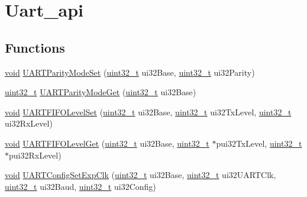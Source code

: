 \hypertarget{group__uart__api}{}\section{Uart\+\_\+api}
\label{group__uart__api}
\subsection*{Functions}
\begin{DoxyCompactItemize}
\item 
\hyperlink{usb__devapi_8h_afabf60e7f57651d6d595a02c75f07cd0}{void} \hyperlink{group__uart__api_gacd54a0a57df52618d1ebf5581b5927bf}{U\+A\+R\+T\+Parity\+Mode\+Set} (\hyperlink{_p_e___types_8h_a33594304e786b158f3fb30289278f5af}{uint32\+\_\+t} ui32\+Base, \hyperlink{_p_e___types_8h_a33594304e786b158f3fb30289278f5af}{uint32\+\_\+t} ui32\+Parity)
\item 
\hyperlink{_p_e___types_8h_a33594304e786b158f3fb30289278f5af}{uint32\+\_\+t} \hyperlink{group__uart__api_ga8ee93b49e449bc738b01eb680b00e1f0}{U\+A\+R\+T\+Parity\+Mode\+Get} (\hyperlink{_p_e___types_8h_a33594304e786b158f3fb30289278f5af}{uint32\+\_\+t} ui32\+Base)
\item 
\hyperlink{usb__devapi_8h_afabf60e7f57651d6d595a02c75f07cd0}{void} \hyperlink{group__uart__api_gae8dd6aeabd442a4cd231bd618897e503}{U\+A\+R\+T\+F\+I\+F\+O\+Level\+Set} (\hyperlink{_p_e___types_8h_a33594304e786b158f3fb30289278f5af}{uint32\+\_\+t} ui32\+Base, \hyperlink{_p_e___types_8h_a33594304e786b158f3fb30289278f5af}{uint32\+\_\+t} ui32\+Tx\+Level, \hyperlink{_p_e___types_8h_a33594304e786b158f3fb30289278f5af}{uint32\+\_\+t} ui32\+Rx\+Level)
\item 
\hyperlink{usb__devapi_8h_afabf60e7f57651d6d595a02c75f07cd0}{void} \hyperlink{group__uart__api_ga41337038041a625f3030b16a4efa287c}{U\+A\+R\+T\+F\+I\+F\+O\+Level\+Get} (\hyperlink{_p_e___types_8h_a33594304e786b158f3fb30289278f5af}{uint32\+\_\+t} ui32\+Base, \hyperlink{_p_e___types_8h_a33594304e786b158f3fb30289278f5af}{uint32\+\_\+t} $\ast$pui32\+Tx\+Level, \hyperlink{_p_e___types_8h_a33594304e786b158f3fb30289278f5af}{uint32\+\_\+t} $\ast$pui32\+Rx\+Level)
\item 
\hyperlink{usb__devapi_8h_afabf60e7f57651d6d595a02c75f07cd0}{void} \hyperlink{group__uart__api_gaacfccbb6fb7e3e3138573bfc4835250b}{U\+A\+R\+T\+Config\+Set\+Exp\+Clk} (\hyperlink{_p_e___types_8h_a33594304e786b158f3fb30289278f5af}{uint32\+\_\+t} ui32\+Base, \hyperlink{_p_e___types_8h_a33594304e786b158f3fb30289278f5af}{uint32\+\_\+t} ui32\+U\+A\+R\+T\+Clk, \hyperlink{_p_e___types_8h_a33594304e786b158f3fb30289278f5af}{uint32\+\_\+t} ui32\+Baud, \hyperlink{_p_e___types_8h_a33594304e786b158f3fb30289278f5af}{uint32\+\_\+t} ui32\+Config)

\end{DoxyCompactItemize}
